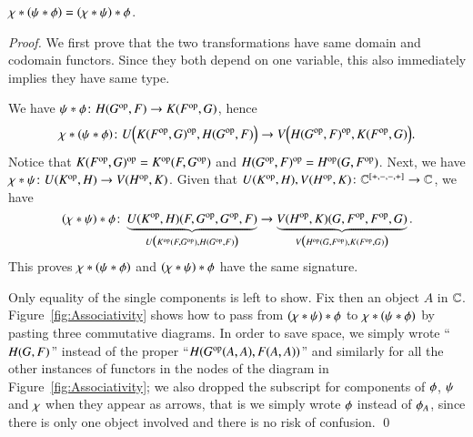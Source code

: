 \begin{theorem}\label{thm:associativity simple case}
    $\hc {\left( \hc \fst \snd \right)} \trd = \hc \fst {\left( \hc \snd \trd \right)}$.
\end{theorem}
\begin{proof}
    We first prove that the two transformations have same domain and codomain functors. Since they both depend on one variable, this also immediately implies they have same type.
    
    We have $\hc \fst \snd \colon \H(\Op\G,\F) \to \K(\Op\F,G)$, hence 
    \[
    \hc {\left( \hc \fst \snd \right)} \trd \colon \U\Bigl(\Op{\K(\Op\F,G)},\H(\Op\G,\F)\Bigr) \to \V\Bigl( \Op{\H(\Op\G,\F)}, \K(\Op\F,G) \Bigr).
    \]
    Notice that $K(F^{\text{op}},G)^{\text{op}} = K^{\text{op}} (F, G^{\text{op}})$ and $H(G^{\text{op}},F)^{\text{op}}  = H^{\text{op}} (G, F^{\text{op}})$. Next, we have ${\chi}\mathbin{\ast}{\psi} \colon U(K^{\text{op}}, H) \to V(H^{\text{op}}, K)$. Given that $U(K^{\text{op}},H), V(H^{\text{op}},K) \colon \mathbb C^{[+,-,-,+]} \to \mathbb C$, we have
    \[
    \hc \fst {\left( \hc \snd \trd \right)} \colon \underbrace{\U(\Op\K, \H)(\F,\Op\G,\Op\G,\F)}_{\U\bigl(\Op\K(\F,\Op\G),\H(\Op\G,\F)\bigr)} \to \underbrace{\V(\Op\H, \K)(\G,\Op\F,\Op\F,\G)}_{\V\bigl( \Op\H(\G,\Op\F), \K(\Op\F,\G) \bigr)}.
    \] 
    This proves $\hc {\left( \hc \fst \snd \right)} \trd$ and $\hc \fst {\left( \hc \snd \trd \right)}$ have the same signature. 
    
    Only equality of the single components is left to show. Fix then an object $A$ in $\mathbb C$. Figure~\ref{fig:Associativity} shows how to pass from $(\trd \ast \snd) \ast \fst$ to $\trd \ast (\snd \ast \fst)$ by pasting three commutative diagrams. In order to save space, we simply wrote ``$H(G,F)$'' instead of the proper ``$H(G^{\text{op}}(A,A),F(A,A))$'' and similarly for all the other instances of functors in the nodes of the diagram in Figure~\ref{fig:Associativity}; we also dropped the subscript for components of $\fst$, $\psi$ and $\chi$ when they appear as arrows, that is we simply wrote $\fst$ instead of $\fst_A$, since there is only one object involved and there is no risk of confusion. \qed
\end{proof}

